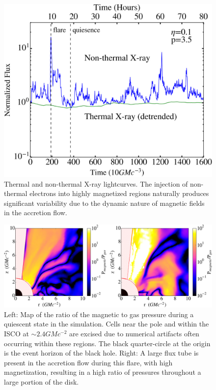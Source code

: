 \begin{figure}
	\centering
	\includegraphics[angle=0,width=\columnwidth]{paper1_fig2}
	\caption{Thermal and non-thermal X-ray lightcurves.  The injection of non-thermal electrons into highly magnetized regions naturally produces significant variability due to the dynamic nature of magnetic fields in the accretion flow.}
	\label{fig2}
\end{figure}


\begin{figure}
	\centering
	\includegraphics[angle=0,width=\columnwidth]{paper1_fig4}
	\caption{Left: Map of the ratio of the magnetic to gas pressure during a quiescent state in the simulation.  Cells near the pole and within the ISCO at $\sim 2.4 GMc^{-2}$ are excised due to numerical artifacts often occurring within these regions.  The black quarter-circle at the origin is the event horizon of the black hole.  Right: A large flux tube is present in the accretion flow during this flare, with high magnetization, resulting in a high ratio of pressures throughout a large portion of the disk. }
	\label{fig3}
\end{figure}

